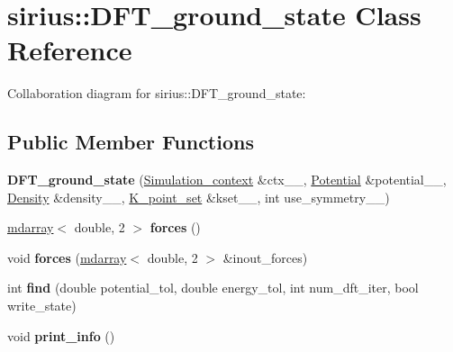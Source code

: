 \hypertarget{classsirius_1_1_d_f_t__ground__state}{}\section{sirius\+:\+:D\+F\+T\+\_\+ground\+\_\+state Class Reference}
\label{classsirius_1_1_d_f_t__ground__state}


Collaboration diagram for sirius\+:\+:D\+F\+T\+\_\+ground\+\_\+state\+:
\subsection*{Public Member Functions}
\begin{DoxyCompactItemize}
\item 
\hypertarget{classsirius_1_1_d_f_t__ground__state_acaa39ea304fc6e3acb16fb7ebfbad85c}{}{\bfseries D\+F\+T\+\_\+ground\+\_\+state} (\hyperlink{classsirius_1_1_simulation__context}{Simulation\+\_\+context} \&ctx\+\_\+\+\_\+, \hyperlink{classsirius_1_1_potential}{Potential} \&potential\+\_\+\+\_\+, \hyperlink{classsirius_1_1_density}{Density} \&density\+\_\+\+\_\+, \hyperlink{classsirius_1_1_k__point__set}{K\+\_\+point\+\_\+set} \&kset\+\_\+\+\_\+, int use\+\_\+symmetry\+\_\+\+\_\+)\label{classsirius_1_1_d_f_t__ground__state_acaa39ea304fc6e3acb16fb7ebfbad85c}

\item 
\hypertarget{classsirius_1_1_d_f_t__ground__state_ade9908a37ed8b354187ff3e20377cca8}{}\hyperlink{classsddk_1_1mdarray}{mdarray}$<$ double, 2 $>$ {\bfseries forces} ()\label{classsirius_1_1_d_f_t__ground__state_ade9908a37ed8b354187ff3e20377cca8}

\item 
\hypertarget{classsirius_1_1_d_f_t__ground__state_a53c9ac60de388745aedc0438ffe374ae}{}void {\bfseries forces} (\hyperlink{classsddk_1_1mdarray}{mdarray}$<$ double, 2 $>$ \&inout\+\_\+forces)\label{classsirius_1_1_d_f_t__ground__state_a53c9ac60de388745aedc0438ffe374ae}

\item 
\hypertarget{classsirius_1_1_d_f_t__ground__state_af0e78c1359a003dec43505c6055fb03a}{}int {\bfseries find} (double potential\+\_\+tol, double energy\+\_\+tol, int num\+\_\+dft\+\_\+iter, bool write\+\_\+state)\label{classsirius_1_1_d_f_t__ground__state_af0e78c1359a003dec43505c6055fb03a}

\item 
\hypertarget{classsirius_1_1_d_f_t__ground__state_a774703bc2e2f52946ef6b68c0d1ca1b1}{}void {\bfseries print\+\_\+info} ()\label{classsirius_1_1_d_f_t__ground__state_a774703bc2e2f52946ef6b68c0d1ca1b1}


\end{DoxyCompactItemize}
